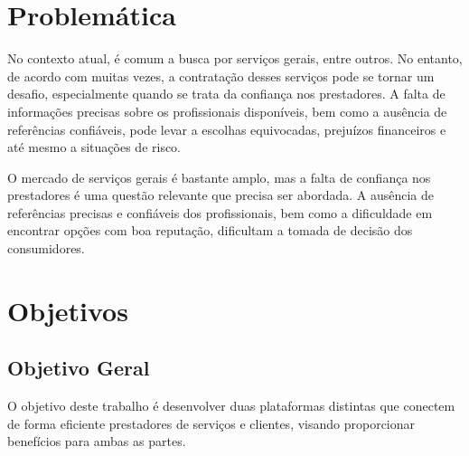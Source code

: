\section{Problemática}

No contexto atual, é comum a busca por serviços gerais, entre outros. No entanto, de acordo com \textcite{FEUP2009} muitas vezes, a contratação desses serviços pode se tornar um desafio, especialmente quando se trata da confiança nos prestadores. A falta de informações precisas sobre os profissionais disponíveis, bem como a ausência de referências confiáveis, pode levar a escolhas equivocadas, prejuízos financeiros e até mesmo a situações de risco.

O mercado de serviços gerais é bastante amplo, mas a falta de confiança nos prestadores é uma questão relevante que precisa ser abordada. A ausência de referências precisas e confiáveis dos profissionais, bem como a dificuldade em encontrar opções com boa reputação, dificultam a tomada de decisão dos consumidores.

\section{Objetivos}



\subsection{Objetivo Geral}
O objetivo deste trabalho é desenvolver duas plataformas distintas que conectem de forma eficiente prestadores de serviços e clientes, visando proporcionar benefícios para ambas as partes.
